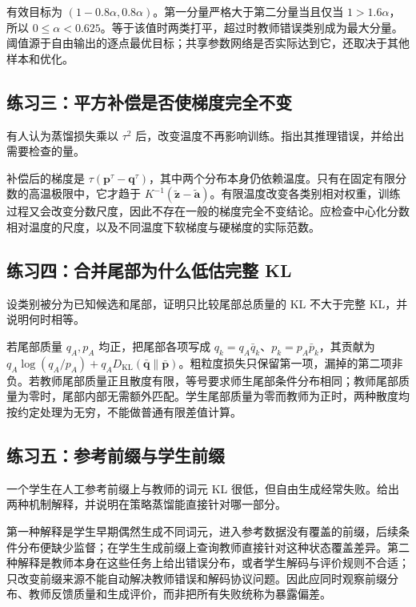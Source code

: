 \documentclass[UTF8,12pt,a4paper,fontset=fandol]{ctexart}
\begin{document}
\begin{solve}
有效目标为 $(1-0.8\alpha,0.8\alpha)$。第一分量严格大于第二分量当且仅当 $1>1.6\alpha$，所以 $0\leq\alpha<0.625$。等于该值时两类打平，超过时教师错误类别成为最大分量。阈值源于自由输出的逐点最优目标；共享参数网络是否实际达到它，还取决于其他样本和优化。
\end{solve}

\subsection{练习三：平方补偿是否使梯度完全不变}
有人认为蒸馏损失乘以 $\tau^2$ 后，改变温度不再影响训练。指出其推理错误，并给出需要检查的量。

\begin{solve}
补偿后的梯度是 $\tau(\mathbf p^\tau-\mathbf q^\tau)$，其中两个分布本身仍依赖温度。只有在固定有限分数的高温极限中，它才趋于 $K^{-1}(\widetilde{\mathbf z}-\widetilde{\mathbf a})$。有限温度改变各类别相对权重，训练过程又会改变分数尺度，因此不存在一般的梯度完全不变结论。应检查中心化分数相对温度的尺度，以及不同温度下软梯度与硬梯度的实际范数。
\end{solve}

\subsection{练习四：合并尾部为什么低估完整 KL}
设类别被分为已知候选和尾部，证明只比较尾部总质量的 KL 不大于完整 KL，并说明何时相等。

\begin{solve}
若尾部质量 $q_A,p_A$ 均正，把尾部各项写成 $q_k=q_A\bar q_k$、$p_k=p_A\bar p_k$，其贡献为 $q_A\log(q_A/p_A)+q_AD_{\mathrm{KL}}(\bar{\mathbf q}\|\bar{\mathbf p})$。粗粒度损失只保留第一项，漏掉的第二项非负。若教师尾部质量正且散度有限，等号要求师生尾部条件分布相同；教师尾部质量为零时，尾部内部无需额外匹配。学生尾部质量为零而教师为正时，两种散度均按约定处理为无穷，不能做普通有限差值计算。
\end{solve}

\subsection{练习五：参考前缀与学生前缀}
一个学生在人工参考前缀上与教师的词元 KL 很低，但自由生成经常失败。给出两种机制解释，并说明在策略蒸馏能直接针对哪一部分。

\begin{solve}
第一种解释是学生早期偶然生成不同词元，进入参考数据没有覆盖的前缀，后续条件分布便缺少监督；在学生生成前缀上查询教师直接针对这种状态覆盖差异。第二种解释是教师本身在这些任务上给出错误分布，或者学生解码与评价规则不合适；只改变前缀来源不能自动解决教师错误和解码协议问题。因此应同时观察前缀分布、教师反馈质量和生成评价，而非把所有失败统称为暴露偏差。
\end{solve}
\end{document}
